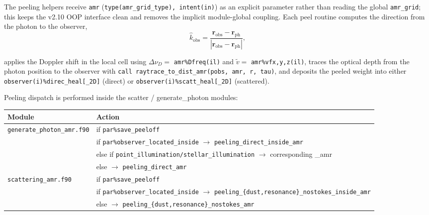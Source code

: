 \documentclass[english,a4paper]{my_memo}
\begin{document}
The peeling helpers receive \texttt{amr} (\texttt{type(amr\_grid\_type),
intent(in)}) as an explicit parameter rather than reading the global
\texttt{amr\_grid}; this keeps the v2.10 OOP interface clean and
removes the implicit module-global coupling.  Each peel routine
computes the direction from the photon to the observer,
\begin{equation}
  \hat{k}_\mathrm{obs}
    = \frac{\mathbf{r}_\mathrm{obs} - \mathbf{r}_\mathrm{ph}}
           {|\mathbf{r}_\mathrm{obs} - \mathbf{r}_\mathrm{ph}|},
\end{equation}
\begin{sloppypar}
applies the Doppler shift in the local cell using
$\Delta\nu_D = $ \texttt{amr\%Dfreq(il)} and $\tilde{v} = $
\texttt{amr\%vfx,y,z(il)}, traces the optical depth from the photon
position to the observer with
\texttt{call raytrace\_to\_dist\_amr(pobs, amr, r, tau)}, and deposits
the peeled weight into either
\texttt{observer(i)\%direc\_heal[\_2D]} (direct) or
\texttt{observer(i)\%scatt\_heal[\_2D]} (scattered).
\end{sloppypar}

Peeling dispatch is performed inside the scatter / generate\_photon
modules:
\begin{center}
{\footnotesize
\begin{tabular}{lp{320pt}}
\hline
Module                       & Action \\
\hline
\texttt{generate\_photon\_amr.f90}
  & if \texttt{par\%save\_peeloff} \\
  & \quad if \texttt{par\%observer\_located\_inside}
            $\to$ \texttt{peeling\_direct\_inside\_amr} \\
  & \quad else if \texttt{point\_illumination/stellar\_illumination}
            $\to$ corresponding \_amr \\
  & \quad else $\to$ \texttt{peeling\_direct\_amr} \\
\texttt{scattering\_amr.f90}
  & if \texttt{par\%save\_peeloff} \\
  & \quad if \texttt{par\%observer\_located\_inside} $\to$\newline
            \hspace*{2em}\texttt{peeling\_\{dust,resonance\}\_nostokes\_inside\_amr} \\
  & \quad else $\to$ \texttt{peeling\_\{dust,resonance\}\_nostokes\_amr} \\
\hline
\end{tabular}
}
\end{center}
\end{document}
